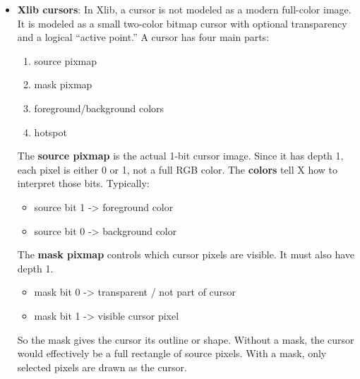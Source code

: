 \documentclass{report}
\begin{document}
\begin{itemize}
\begin{cppcode}
            \end{cppcode}
            \bigbreak \noindent
            \begin{itemize}
                \item display Specifies the connection to the X server.
                \item pixmap Specifies the pixmap.
            \end{itemize}
            The \textbf{XFreePixmap} function first deletes the association between the pixmap ID and the pixmap. Then, the X server frees the pixmap storage when there are no references to it. The pixmap should never be referenced again.
            \bigbreak \noindent 
            \textbf{XFreePixmap} can generate a \textbf{BadPixmap} error.
        \item \textbf{Xlib cursors}: In Xlib, a cursor is not modeled as a modern full-color image. It is modeled as a small two-color bitmap cursor with optional transparency and a logical “active point.”
            \bigbreak \noindent 
            A cursor has four main parts:
            \begin{enumerate}
                \item source pixmap
                \item mask pixmap
                \item foreground/background colors
                \item hotspot
            \end{enumerate}
            The \textbf{source pixmap} is the actual 1-bit cursor image. Since it has depth 1, each pixel is either 0 or 1, not a full RGB color.
            \bigbreak \noindent 
            The \textbf{colors} tell X how to interpret those bits. Typically:
            \begin{itemize}
                \item source bit 1 -> foreground color
                \item source bit 0 -> background color
            \end{itemize}
            The \textbf{mask pixmap} controls which cursor pixels are visible. It must also have depth 1.
            \begin{itemize}
                \item mask bit 0 -> transparent / not part of cursor
                \item mask bit 1 -> visible cursor pixel
            \end{itemize}
            So the mask gives the cursor its outline or shape. Without a mask, the cursor would effectively be a full rectangle of source pixels. With a mask, only selected pixels are drawn as the cursor.

\end{itemize}
\end{document}
